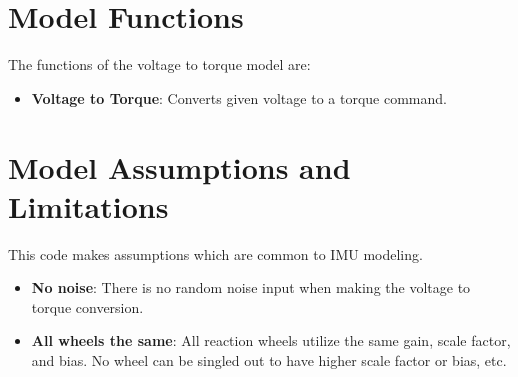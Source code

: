 \section{Model Functions}
The functions of the voltage to torque model are:
\begin{itemize}
	\item \textbf{Voltage to Torque}: Converts given voltage to a torque command.
\end{itemize}


\section{Model Assumptions and Limitations}
This code makes assumptions which are common to IMU modeling.
\begin{itemize}
	\item \textbf{No noise}: There is no random noise input when making the voltage to torque conversion.
	\item \textbf{All wheels the same}: All reaction wheels utilize the same gain, scale factor, and bias. No wheel can be singled out to have higher scale factor or bias, etc.

\end{itemize}